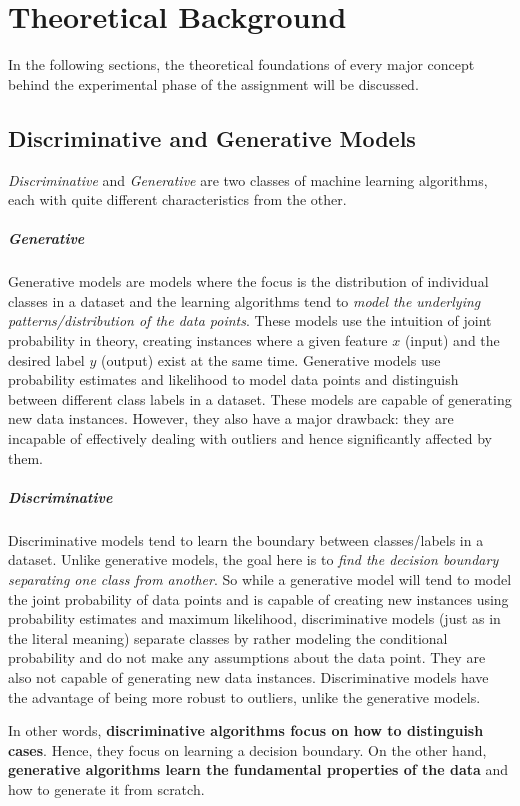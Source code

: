 \chapter{Theoretical Background}

In the following sections, the theoretical foundations of every major concept behind the experimental phase of the assignment will be discussed.

\section{Discriminative and Generative Models}

\textit{Discriminative} and \textit{Generative} are two classes of machine learning algorithms, each with quite different characteristics from the other.

\paragraph{Generative} Generative models are models where the focus is the distribution of individual classes in a dataset and the learning algorithms tend to \textit{model the underlying patterns/distribution of the data points}. These models use the intuition of joint probability in theory, creating instances where a given feature $x$ (input) and the desired label $y$ (output) exist at the same time.
Generative models use probability estimates and likelihood to model data points and distinguish between different class labels in a dataset. These models are capable of generating new data instances. However, they also have a major drawback: they are incapable of effectively dealing with outliers and hence significantly affected by them.

\paragraph{Discriminative} Discriminative models tend to learn the boundary between classes/labels in a dataset. Unlike generative models, the goal here is to \textit{find the decision boundary separating one class from another}.
So while a generative model will tend to model the joint probability of data points and is capable of creating new instances using probability estimates and maximum likelihood, discriminative models (just as in the literal meaning) separate classes by rather modeling the conditional probability and do not make any assumptions about the data point. They are also not capable of generating new data instances.
Discriminative models have the advantage of being more robust to outliers, unlike the generative models.
\newline
\par
In other words, \textbf{discriminative algorithms focus on how to distinguish cases}. Hence, they focus on learning a decision boundary. On the other hand, \textbf{generative algorithms learn the fundamental properties of the data} and how to generate it from scratch.

